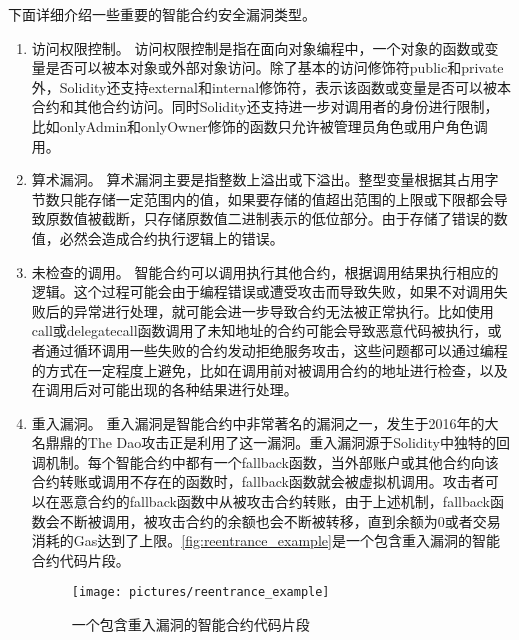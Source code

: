 下面详细介绍一些重要的智能合约安全漏洞类型。
\begin{enumerate}[label=(\arabic*)]
    \item 访问权限控制。
    访问权限控制是指在面向对象编程中，一个对象的函数或变量是否可以被本对象或外部对象访问。除了基本的访问修饰符public和private外，Solidity还支持external和internal修饰符，表示该函数或变量是否可以被本合约和其他合约访问。同时Solidity还支持进一步对调用者的身份进行限制，比如onlyAdmin和onlyOwner修饰的函数只允许被管理员角色或用户角色调用\cite{grishchenko2018semantic}。
    \item 算术漏洞。
    算术漏洞主要是指整数上溢出或下溢出。整型变量根据其占用字节数只能存储一定范围内的值，如果要存储的值超出范围的上限或下限都会导致原数值被截断，只存储原数值二进制表示的低位部分。由于存储了错误的数值，必然会造成合约执行逻辑上的错误。
    \item 未检查的调用。
    智能合约可以调用执行其他合约，根据调用结果执行相应的逻辑。这个过程可能会由于编程错误或遭受攻击而导致失败，如果不对调用失败后的异常进行处理，就可能会进一步导致合约无法被正常执行。比如使用call或delegatecall函数调用了未知地址的合约可能会导致恶意代码被执行，或者通过循环调用一些失败的合约发动拒绝服务攻击，这些问题都可以通过编程的方式在一定程度上避免，比如在调用前对被调用合约的地址进行检查，以及在调用后对可能出现的各种结果进行处理\cite{zhang2022zh}。
    \item 重入漏洞。
    重入漏洞是智能合约中非常著名的漏洞之一，发生于2016年的大名鼎鼎的The Dao攻击正是利用了这一漏洞。重入漏洞源于Solidity中独特的回调机制。每个智能合约中都有一个fallback函数，当外部账户或其他合约向该合约转账或调用不存在的函数时，fallback函数就会被虚拟机调用。攻击者可以在恶意合约的fallback函数中从被攻击合约转账，由于上述机制，fallback函数会不断被调用，被攻击合约的余额也会不断被转移，直到余额为0或者交易消耗的Gas达到了上限。\autoref{fig:reentrance_example}是一个包含重入漏洞的智能合约代码片段。
    \begin{figure}[htbp]
        \centering
        \texttt{[image: pictures/reentrance\_example]}
        \caption{\label{fig:reentrance_example}一个包含重入漏洞的智能合约代码片段}
    \end{figure}
    
    

\end{enumerate}
